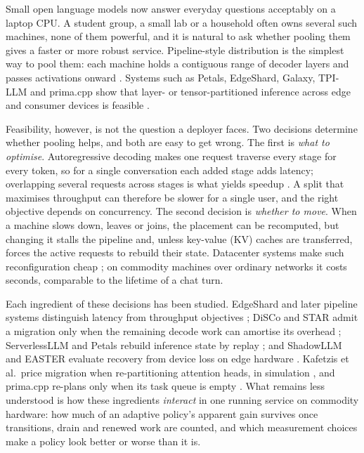 \documentclass[preprint,12pt]{elsarticle}
\begin{document}
Small open language models now answer everyday questions acceptably on a
laptop CPU. A student group, a small lab or a household often owns
several such machines, none of them powerful, and it is natural to ask
whether pooling them gives a faster or more robust service.
Pipeline-style distribution is the simplest way to pool them: each
machine holds a contiguous range of decoder layers and passes
activations onward \citep{huang2019gpipe, narayanan2019pipedream}.
Systems such as Petals, EdgeShard, Galaxy, TPI-LLM and prima.cpp show
that layer- or tensor-partitioned inference across edge and consumer
devices is feasible
\citep{borzunov2023petals, edgeshard2025, galaxy2024, tpi2025, prima2026}.

Feasibility, however, is not the question a deployer faces. Two
decisions determine whether pooling helps, and both are easy to get
wrong. The first is \emph{what to optimise}. Autoregressive decoding
makes one request traverse every stage for every token, so for a single
conversation each added stage adds latency; overlapping several requests
across stages is what yields speedup \citep{huang2019gpipe, yu2022orca}.
A split that maximises throughput can therefore be slower for a single
user, and the right objective depends on concurrency. The second
decision is \emph{whether to move}. When a machine slows down, leaves or
joins, the placement can be recomputed, but changing it stalls the
pipeline and, unless key-value (KV) caches are transferred, forces the
active requests to rebuild their state. Datacenter systems make such
reconfiguration cheap
\citep{sun2024llumnix, fu2024serverlessllm, miao2023spotserve}; on
commodity machines over ordinary networks it costs seconds, comparable
to the lifetime of a chat turn.

Each ingredient of these decisions has been studied. EdgeShard and later
pipeline systems distinguish latency from throughput objectives
\citep{edgeshard2025, lin2026dynopipe}; DiSCo and STAR admit a migration
only when the remaining decode work can amortise its overhead
\citep{sun-etal-2025-disco, star2026}; ServerlessLLM and Petals rebuild
inference state by replay
\citep{fu2024serverlessllm, borzunov2023petals}; and ShadowLLM and
EASTER evaluate recovery from device loss on edge hardware
\citep{chen2026shadowllmhotstandby, easter2024}. Kafetzis et al.~price
migration when re-partitioning attention heads, in simulation
\citep{kafetzis2025partitioning}, and prima.cpp re-plans only when its
task queue is empty \citep{prima2026}. What remains less understood is
how these ingredients \emph{interact} in one running service on
commodity hardware: how much of an adaptive policy's apparent gain
survives once transitions, drain and renewed work are counted, and which
measurement choices make a policy look better or worse than it is.
\end{document}
